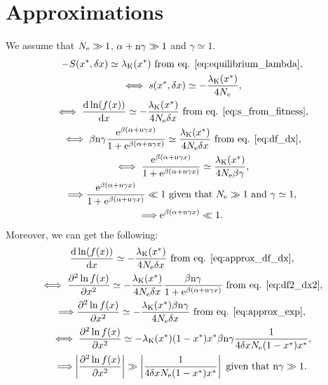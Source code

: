 \documentclass{article}
\begin{document}
\section*{Approximations}
We assume that $N_{\mathrm{e}} \gg 1$, $\alpha + \text{n} \gamma \gg 1$ and $ \gamma \simeq 1$.
\begin{gather}
-S(x^{*}, \delta x) \simeq \lambda_{\text{K}}(x^{*})\text{ from eq. \ref{eq:equilibrium_lambda}}, \\
\iff s(x^{*}, \delta x) \simeq -\frac{\lambda_{\text{K}}(x^{*})}{4 N_{\mathrm{e}}}, \\
\iff \frac{\mathrm{d} \ln (f(x))}{\mathrm{d} x} \simeq - \frac{\lambda_{\text{K}}(x^{*})}{4 N_{\mathrm{e}} \delta x}\text{ from eq. \ref{eq:s_from_fitness}}, \label{eq:approx_df_dx}\\
\iff \beta \text{n} \gamma \frac{\mathrm{e}^{\beta(\alpha + \text{n} \gamma x)}}{1 + \mathrm{e}^{\beta(\alpha + \text{n} \gamma x)} } \simeq \frac{\lambda_{\text{K}}(x^{*})}{4 N_{\mathrm{e}} \delta x}\text{ from eq. \ref{eq:df_dx}}, \\
\iff \frac{\mathrm{e}^{\beta(\alpha + \text{n} \gamma x)}}{1 + \mathrm{e}^{\beta(\alpha + \text{n} \gamma x)}} \simeq \frac{\lambda_{\text{K}}(x^{*})}{4 N_{\mathrm{e}} \beta \gamma}, \\
\Longrightarrow \frac{\mathrm{e}^{\beta(\alpha + \text{n} \gamma x)}}{1 + \mathrm{e}^{\beta(\alpha + \text{n} \gamma x)}} \ll 1\text{ given that $N_{\mathrm{e}} \gg 1$ and $ \gamma  \simeq 1$}, \\
\Longrightarrow \mathrm{e}^{\beta(\alpha + \text{n} \gamma x)} \ll 1. \label{eq:approx_exp}
\end{gather}
Moreover, we can get the following:
\begin{gather}
\frac{\mathrm{d} \ln (f(x))}{\mathrm{d} x} \simeq - \frac{\lambda_{\text{K}}(x^{*})}{4 N_{\mathrm{e}} \delta x}\text{ from eq. \ref{eq:approx_df_dx}}, \\
\iff \frac{ \partial^2 \ln f(x) }{\partial {x}^2} \simeq - \frac{\lambda_{\text{K}}(x^{*})}{4 N_{\mathrm{e}} \delta x } \frac{\beta \text{n} \gamma}{1 + \mathrm{e}^{\beta(\alpha + \text{n} \gamma x)}}\text{ from eq. \ref{eq:df2_dx2}}, \\
\Longrightarrow \frac{ \partial^2 \ln f(x) }{\partial {x}^2} \simeq - \frac{\lambda_{\text{K}}(x^{*})\beta \text{n} \gamma}{4 N_{\mathrm{e}} \delta x  }\text{ from eq. \ref{eq:approx_exp}}, \\
\iff \frac{ \partial^2 \ln f(x) }{\partial {x}^2} \simeq - \lambda_{\text{K}}(x^{*}) (1 - x^{*})x^{*} \beta \text{n} \gamma \frac{1}{4 \delta x N_{\mathrm{e}}  (1 - x^{*}) x^{*}}, \\
\Longrightarrow \left| \frac{ \partial^2 \ln f(x) }{\partial {x}^2} \right| \gg \left| \frac{1}{4 \delta x N_{\mathrm{e}}  (1 - x^{*}) x^{*}} \right|\text{ given that $\text{n} \gamma \gg 1$}. \label{eq:approx_df2_df} \\
\end{gather}
\end{document}
